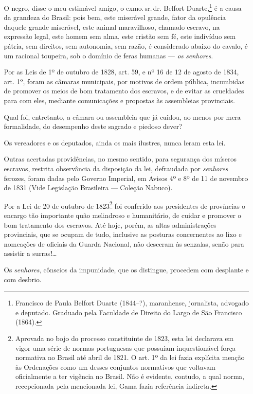 {O negro, disse o meu estimável amigo, o exmo.\,sr.\,dr. Belfort
Duarte,\footnote{Francisco de Paula Belfort Duarte (1844--?),
  maranhense, jornalista, advogado e deputado. Graduado pela Faculdade
  de Direito do Largo de São Francisco (1864).} é a causa da grandeza do
Brasil: pois bem, este miserável grande, fator da opulência daquele
grande miserável, este animal maravilhoso, chamado escravo, na expressão
legal, este homem sem alma, este cristão sem fé, este indivíduo sem
pátria, sem direitos, sem autonomia, sem razão, é considerado abaixo do
cavalo, é um racional toupeira, sob o domínio de feras humanas ---
\emph{os senhores}.

Por as Leis de 1º de outubro de 1828, art. 59, e nº 16 de 12 de agosto
de 1834, art. 1º, foram as câmaras municipais, por motivos de ordem
pública, incumbidas de promover os meios de bom tratamento dos escravos,
e de evitar as crueldades para com eles, mediante comunicações e
propostas às assembleias provinciais.

Qual foi, entretanto, a câmara ou assembleia que já cuidou, ao menos por
mera formalidade, do desempenho deste sagrado e piedoso dever?

Os vereadores e os deputados, ainda os mais ilustres, nunca leram esta
lei.

Outras acertadas providências, no mesmo sentido, para segurança dos
míseros escravos, restrita observância da disposição da lei, defraudada
por \emph{senhores} ferozes, foram dadas pelo Governo Imperial, em
Avisos 4º e 8º de 11 de novembro de 1831 (Vide Legislação
Brasileira --- Coleção Nabuco).

Por a Lei de 20 de outubro de 1823\footnote{Aprovada no bojo do
  processo constituinte de 1823, esta lei declarava em vigor uma série
  de normas portuguesas que possuíam inquestionável força normativa no
  Brasil até abril de 1821. O art. 1º da lei fazia explícita menção às
  Ordenações como um desses conjuntos normativos que voltavam
  oficialmente a ter vigência no Brasil. Não é evidente, contudo, a qual
  norma, recepcionada pela mencionada lei, Gama fazia referência indireta.}
foi conferido aos presidentes de províncias o encargo tão importante
quão melindroso e humanitário, de cuidar e promover o bom tratamento dos
escravos. Até hoje, porém, as altas administrações provinciais, que se
ocupam de tudo, inclusive as posturas concernentes ao lixo e nomeações
de oficiais da Guarda Nacional, não desceram às senzalas, senão para
assistir a surras!\ldots{}

Os \emph{senhores}, cônscios da impunidade, que os distingue, procedem
com desplante e com desbrio.

}
